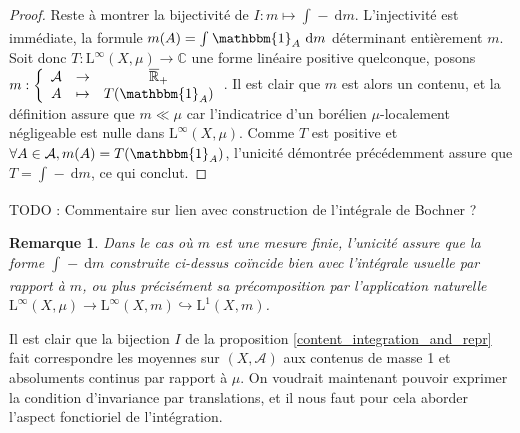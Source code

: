 \documentclass[a4paper,12pt]{article}
\newtheorem{remark}[theorem]{Remarque}
\newcommand{\R}{\mathbb{R}}
\newcommand{\C}{\mathbb{C}}
\newcommand{\indic}{\mathbbm{1}}
\newcommand{\integral}[4]{\int_{#1}^{#2} #3~\mathrm{d}#4}
\newcommand\fundef[3]{#1: \left\{\begin{array}{ccc}#2\\#3\end{array}\right.}
\newcommand{\closure}[1]{\overline{#1}}
\newcommand{\blank}{{-}}
\newcommand{\TODO}[1]{{\color{red}TODO :} #1}
\begin{document}
\begin{proof}
    Reste à montrer la bijectivité de $I:m\mapsto \integral{}{}{\blank}{m}$. L'injectivité est immédiate, la formule $m(A) = \integral{}{}{\indic_A}{m}$ déterminant
    entièrement $m$. Soit donc $T : \mathrm{L}^\infty(X, \mu)\to\C$ une forme linéaire positive quelconque, posons $\fundef{m}{\mathcal{A}&\to&\closure{\R}_+}{A&\mapsto&T(\indic_A)}$.
    Il est clair que $m$ est alors un contenu, et la définition assure que $m\ll\mu$ car l'indicatrice d'un borélien $\mu$-localement négligeable
    est nulle dans $\mathrm{L}^\infty(X,\mu)$. Comme $T$ est positive et $\forall A\in\mathcal{A}, m(A)=T(\indic_A)$, l'unicité 
    démontrée précédemment assure que $T = \integral{}{}{\blank}{m}$, ce qui conclut.
\end{proof}

\TODO{Commentaire sur lien avec construction de l'intégrale de Bochner ?}

\begin{remark}
    Dans le cas où $m$ est une mesure finie, l'unicité assure que la forme $\integral{}{}{\blank}{m}$ construite ci-dessus coïncide bien avec l'intégrale usuelle
    par rapport à $m$, ou plus précisément sa précomposition
    par l'application naturelle $\mathrm{L}^\infty(X, \mu)\to\mathrm{L}^\infty(X, m)\hookrightarrow\mathrm{L}^1(X, m)$.
\end{remark}

Il est clair que la bijection $I$ de la proposition \ref{content_integration_and_repr} fait correspondre les moyennes 
sur $(X, \mathcal{A})$ aux contenus de masse 1 et absoluments continus par rapport à $\mu$. On voudrait maintenant pouvoir exprimer 
la condition d'invariance par translations, et il nous faut pour cela aborder l'aspect fonctioriel de l'intégration.
\end{document}
